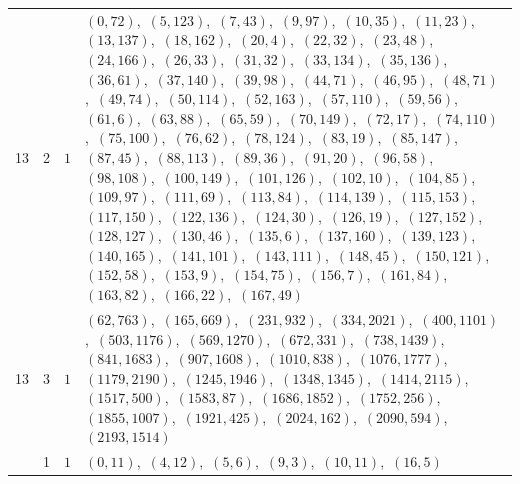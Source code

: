 \documentclass[11pt]{article}
\begin{document}
\begin{longtable}{@{}rrl>{\raggedright\arraybackslash}p{}@{}}
13 & 2 & $1$ & $(0,72)$,\allowbreak\ $(5,123)$,\allowbreak\ $(7,43)$,\allowbreak\ $(9,97)$,\allowbreak\ $(10,35)$,\allowbreak\ $(11,23)$,\allowbreak\ $(13,137)$,\allowbreak\ $(18,162)$,\allowbreak\ $(20,4)$,\allowbreak\ $(22,32)$,\allowbreak\ $(23,48)$,\allowbreak\ $(24,166)$,\allowbreak\ $(26,33)$,\allowbreak\ $(31,32)$,\allowbreak\ $(33,134)$,\allowbreak\ $(35,136)$,\allowbreak\ $(36,61)$,\allowbreak\ $(37,140)$,\allowbreak\ $(39,98)$,\allowbreak\ $(44,71)$,\allowbreak\ $(46,95)$,\allowbreak\ $(48,71)$,\allowbreak\ $(49,74)$,\allowbreak\ $(50,114)$,\allowbreak\ $(52,163)$,\allowbreak\ $(57,110)$,\allowbreak\ $(59,56)$,\allowbreak\ $(61,6)$,\allowbreak\ $(63,88)$,\allowbreak\ $(65,59)$,\allowbreak\ $(70,149)$,\allowbreak\ $(72,17)$,\allowbreak\ $(74,110)$,\allowbreak\ $(75,100)$,\allowbreak\ $(76,62)$,\allowbreak\ $(78,124)$,\allowbreak\ $(83,19)$,\allowbreak\ $(85,147)$,\allowbreak\ $(87,45)$,\allowbreak\ $(88,113)$,\allowbreak\ $(89,36)$,\allowbreak\ $(91,20)$,\allowbreak\ $(96,58)$,\allowbreak\ $(98,108)$,\allowbreak\ $(100,149)$,\allowbreak\ $(101,126)$,\allowbreak\ $(102,10)$,\allowbreak\ $(104,85)$,\allowbreak\ $(109,97)$,\allowbreak\ $(111,69)$,\allowbreak\ $(113,84)$,\allowbreak\ $(114,139)$,\allowbreak\ $(115,153)$,\allowbreak\ $(117,150)$,\allowbreak\ $(122,136)$,\allowbreak\ $(124,30)$,\allowbreak\ $(126,19)$,\allowbreak\ $(127,152)$,\allowbreak\ $(128,127)$,\allowbreak\ $(130,46)$,\allowbreak\ $(135,6)$,\allowbreak\ $(137,160)$,\allowbreak\ $(139,123)$,\allowbreak\ $(140,165)$,\allowbreak\ $(141,101)$,\allowbreak\ $(143,111)$,\allowbreak\ $(148,45)$,\allowbreak\ $(150,121)$,\allowbreak\ $(152,58)$,\allowbreak\ $(153,9)$,\allowbreak\ $(154,75)$,\allowbreak\ $(156,7)$,\allowbreak\ $(161,84)$,\allowbreak\ $(163,82)$,\allowbreak\ $(166,22)$,\allowbreak\ $(167,49)$\\
13 & 3 & $1$ & $(62,763)$,\allowbreak\ $(165,669)$,\allowbreak\ $(231,932)$,\allowbreak\ $(334,2021)$,\allowbreak\ $(400,1101)$,\allowbreak\ $(503,1176)$,\allowbreak\ $(569,1270)$,\allowbreak\ $(672,331)$,\allowbreak\ $(738,1439)$,\allowbreak\ $(841,1683)$,\allowbreak\ $(907,1608)$,\allowbreak\ $(1010,838)$,\allowbreak\ $(1076,1777)$,\allowbreak\ $(1179,2190)$,\allowbreak\ $(1245,1946)$,\allowbreak\ $(1348,1345)$,\allowbreak\ $(1414,2115)$,\allowbreak\ $(1517,500)$,\allowbreak\ $(1583,87)$,\allowbreak\ $(1686,1852)$,\allowbreak\ $(1752,256)$,\allowbreak\ $(1855,1007)$,\allowbreak\ $(1921,425)$,\allowbreak\ $(2024,162)$,\allowbreak\ $(2090,594)$,\allowbreak\ $(2193,1514)$\\
\addlinespace[3pt]
17 & 1 & $1$ & $(0,11)$,\allowbreak\ $(4,12)$,\allowbreak\ $(5,6)$,\allowbreak\ $(9,3)$,\allowbreak\ $(10,11)$,\allowbreak\ $(16,5)$\\

\end{longtable}
\end{document}
